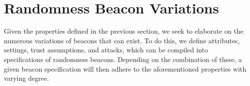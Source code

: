 \section{Randomness Beacon Variations}
Given the properties defined in the previous section, we seek to elaborate on the numerous variations of beacons that can exist.
To do this, we define attributes, settings, trust assumptions, and attacks, which can be compiled into specifications of randomness beacons.
Depending on the combination of these, a given beacon specification will then adhere to the aforementioned properties with varying degree.

